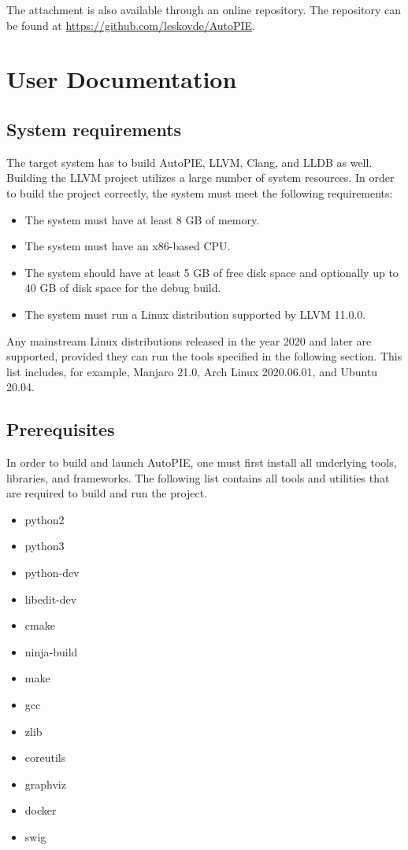 \documentclass[12pt,a4paper]{report}
\begin{document}
The attachment is also available through an online repository. 
The repository can be found at \url{https://github.com/leskovde/AutoPIE}.

\section{User Documentation}

\subsection{System requirements}

The target system has to build AutoPIE, LLVM, Clang, and LLDB as well. 
Building the LLVM project utilizes a large number of system resources.  
In order to build the project correctly, the system must meet the following 
requirements:
\begin{itemize}
  \item The system must have at least 8 GB of memory.
  \item The system must have an x86-based CPU.
  \item The system should have at least 5 GB of free disk space and 
  optionally up to 40 GB of disk space for the debug build.
  \item The system must run a Linux distribution supported by LLVM 11.0.0.
\end{itemize}

Any mainstream Linux distributions released in the year 2020 and later are 
supported, provided they can run the tools specified in the following 
section. 
This list includes, for example, Manjaro 21.0, Arch Linux 2020.06.01, and 
Ubuntu 20.04.

\subsection{Prerequisites}

In order to build and launch AutoPIE, one must first install all underlying 
tools, libraries, and frameworks. 
The following list contains all tools and utilities that are required to 
build and run the project.

\begin{itemize}
  \item python2
  \item python3
  \item python-dev
  \item libedit-dev
  \item cmake
  \item ninja-build
  \item make
  \item gcc
  \item zlib
  \item coreutils
  \item graphviz
  \item docker
  \item swig
\end{itemize}
\end{document}

